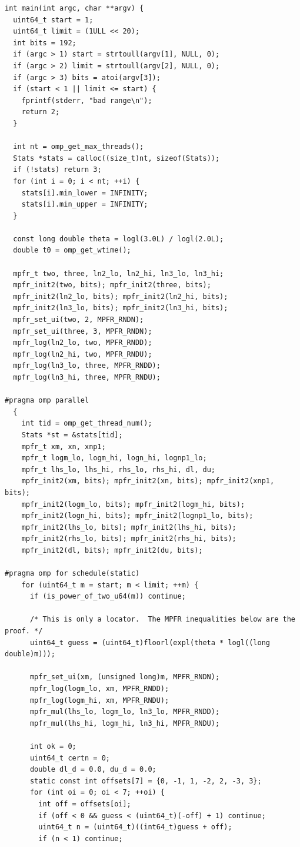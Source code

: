\documentclass[11pt,oneside]{article}
\theoremstyle{definition}
\theoremstyle{remark}
\begin{document}
\begin{lstlisting}[style=pythonstyle,caption={Directed-rounding verifier (C99, MPFR, OpenMP).}]
int main(int argc, char **argv) {
  uint64_t start = 1;
  uint64_t limit = (1ULL << 20);
  int bits = 192;
  if (argc > 1) start = strtoull(argv[1], NULL, 0);
  if (argc > 2) limit = strtoull(argv[2], NULL, 0);
  if (argc > 3) bits = atoi(argv[3]);
  if (start < 1 || limit <= start) {
    fprintf(stderr, "bad range\n");
    return 2;
  }

  int nt = omp_get_max_threads();
  Stats *stats = calloc((size_t)nt, sizeof(Stats));
  if (!stats) return 3;
  for (int i = 0; i < nt; ++i) {
    stats[i].min_lower = INFINITY;
    stats[i].min_upper = INFINITY;
  }

  const long double theta = logl(3.0L) / logl(2.0L);
  double t0 = omp_get_wtime();

  mpfr_t two, three, ln2_lo, ln2_hi, ln3_lo, ln3_hi;
  mpfr_init2(two, bits); mpfr_init2(three, bits);
  mpfr_init2(ln2_lo, bits); mpfr_init2(ln2_hi, bits);
  mpfr_init2(ln3_lo, bits); mpfr_init2(ln3_hi, bits);
  mpfr_set_ui(two, 2, MPFR_RNDN);
  mpfr_set_ui(three, 3, MPFR_RNDN);
  mpfr_log(ln2_lo, two, MPFR_RNDD);
  mpfr_log(ln2_hi, two, MPFR_RNDU);
  mpfr_log(ln3_lo, three, MPFR_RNDD);
  mpfr_log(ln3_hi, three, MPFR_RNDU);

#pragma omp parallel
  {
    int tid = omp_get_thread_num();
    Stats *st = &stats[tid];
    mpfr_t xm, xn, xnp1;
    mpfr_t logm_lo, logm_hi, logn_hi, lognp1_lo;
    mpfr_t lhs_lo, lhs_hi, rhs_lo, rhs_hi, dl, du;
    mpfr_init2(xm, bits); mpfr_init2(xn, bits); mpfr_init2(xnp1, bits);
    mpfr_init2(logm_lo, bits); mpfr_init2(logm_hi, bits);
    mpfr_init2(logn_hi, bits); mpfr_init2(lognp1_lo, bits);
    mpfr_init2(lhs_lo, bits); mpfr_init2(lhs_hi, bits);
    mpfr_init2(rhs_lo, bits); mpfr_init2(rhs_hi, bits);
    mpfr_init2(dl, bits); mpfr_init2(du, bits);

#pragma omp for schedule(static)
    for (uint64_t m = start; m < limit; ++m) {
      if (is_power_of_two_u64(m)) continue;

      /* This is only a locator.  The MPFR inequalities below are the proof. */
      uint64_t guess = (uint64_t)floorl(expl(theta * logl((long double)m)));

      mpfr_set_ui(xm, (unsigned long)m, MPFR_RNDN);
      mpfr_log(logm_lo, xm, MPFR_RNDD);
      mpfr_log(logm_hi, xm, MPFR_RNDU);
      mpfr_mul(lhs_lo, logm_lo, ln3_lo, MPFR_RNDD);
      mpfr_mul(lhs_hi, logm_hi, ln3_hi, MPFR_RNDU);

      int ok = 0;
      uint64_t certn = 0;
      double dl_d = 0.0, du_d = 0.0;
      static const int offsets[7] = {0, -1, 1, -2, 2, -3, 3};
      for (int oi = 0; oi < 7; ++oi) {
        int off = offsets[oi];
        if (off < 0 && guess < (uint64_t)(-off) + 1) continue;
        uint64_t n = (uint64_t)((int64_t)guess + off);
        if (n < 1) continue;


\end{lstlisting}
\end{document}
